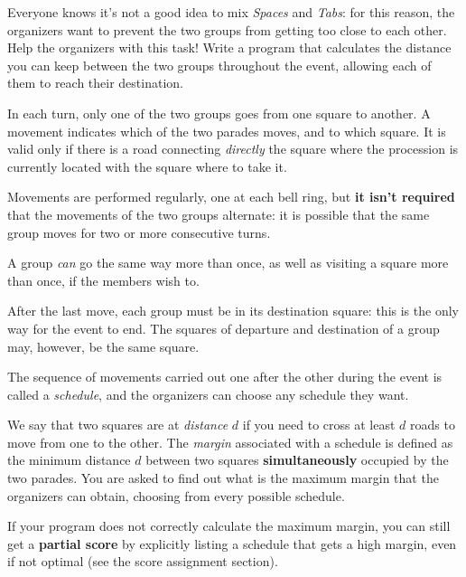 Everyone knows it's not a good idea to mix \emph{Spaces} and \emph{Tabs}: for this reason, the organizers want to prevent the two groups from getting too close to each other. Help the organizers with this task! Write a program that calculates the distance you can keep between the two groups throughout the event, allowing each of them to reach their destination.


\begin{mdframed}[backgroundcolor=black!10,rightline=false,leftline=false]

\Specs

\small

In each turn, only one of the two groups goes from one square to another.
A movement indicates which of the two parades moves, and to which square. It is valid only if there is a road connecting \emph{directly} the square where the procession is currently located with the square where to take it.

Movements are performed regularly, one at each bell ring, but \textbf{it isn't required} that the movements of the two groups alternate: it is possible that the same group moves for two or more consecutive turns.

A group \emph{can} go the same way more than once, as well as visiting a square more than once, if the members wish to.

After the last move, each group must be in its destination square: this is the only way for the event to end. The squares of departure and destination of a group may, however, be the same square.

The sequence of movements carried out one after the other during the event is called a \emph{schedule}, and the organizers can choose any schedule they want.

We say that two squares are at \emph{distance} $d$ if you need to cross at least $d$ roads to move from one to the other. The \emph{margin} associated with a schedule is defined as the minimum distance $d$ between two squares \textbf{simultaneously} occupied by the two parades. You are asked to find out what is the maximum margin that the organizers can obtain, choosing from every possible schedule.

If your program does not correctly calculate the maximum margin, you can still get a \textbf{partial score} by explicitly listing a schedule that gets a high margin, even if not optimal (see the score assignment section).

\end{mdframed}

